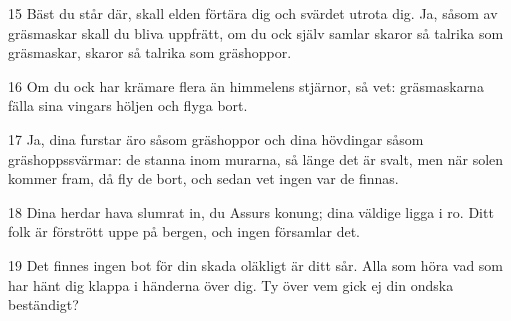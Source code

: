 \par 15 Bäst du står där, skall elden förtära dig och svärdet utrota dig. Ja, såsom av gräsmaskar skall du bliva uppfrätt, om du ock själv samlar skaror så talrika som gräsmaskar, skaror så talrika som gräshoppor.
\par 16 Om du ock har krämare flera än himmelens stjärnor, så vet: gräsmaskarna fälla sina vingars höljen och flyga bort.
\par 17 Ja, dina furstar äro såsom gräshoppor och dina hövdingar såsom gräshoppssvärmar: de stanna inom murarna, så länge det är svalt, men när solen kommer fram, då fly de bort, och sedan vet ingen var de finnas.
\par 18 Dina herdar hava slumrat in, du Assurs konung; dina väldige ligga i ro. Ditt folk är förstrött uppe på bergen, och ingen församlar det.
\par 19 Det finnes ingen bot för din skada oläkligt är ditt sår. Alla som höra vad som har hänt dig klappa i händerna över dig. Ty över vem gick ej din ondska beständigt?


